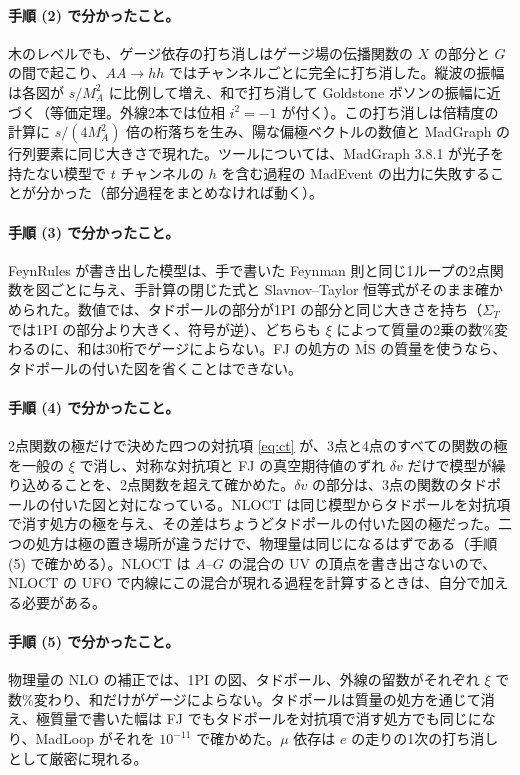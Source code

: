 \documentclass[a4paper,10pt]{ltjsarticle}
\newcommand{\MSbar}{\overline{\mathrm{MS}}}
\begin{document}
\paragraph{手順 (2) で分かったこと。}木のレベルでも、ゲージ依存の打ち消しはゲージ場の伝播関数の $X$ の部分と $G$ の間で起こり、$AA\to hh$ ではチャンネルごとに完全に打ち消した。縦波の振幅は各図が $s/M_A^2$ に比例して増え、和で打ち消して Goldstone ボソンの振幅に近づく（等価定理。外線2本では位相 $i^2=-1$ が付く）。この打ち消しは倍精度の計算に $s/(4M_A^2)$ 倍の桁落ちを生み、陽な偏極ベクトルの数値と MadGraph の行列要素に同じ大きさで現れた。ツールについては、MadGraph 3.8.1 が光子を持たない模型で $t$ チャンネルの $h$ を含む過程の MadEvent の出力に失敗することが分かった（部分過程をまとめなければ動く）。

\paragraph{手順 (3) で分かったこと。}FeynRules が書き出した模型は、手で書いた Feynman 則と同じ1ループの2点関数を図ごとに与え、手計算の閉じた式と Slavnov--Taylor 恒等式がそのまま確かめられた。数値では、タドポールの部分が1PI の部分と同じ大きさを持ち（$\Sigma_T$ では1PI の部分より大きく、符号が逆）、どちらも $\xi$ によって質量の2乗の数\%変わるのに、和は30桁でゲージによらない。FJ の処方の $\MSbar$ の質量を使うなら、タドポールの付いた図を省くことはできない。

\paragraph{手順 (4) で分かったこと。}2点関数の極だけで決めた四つの対抗項 \eqref{eq:ct} が、3点と4点のすべての関数の極を一般の $\xi$ で消し、対称な対抗項と FJ の真空期待値のずれ $\delta v$ だけで模型が繰り込めることを、2点関数を超えて確かめた。$\delta v$ の部分は、3点の関数のタドポールの付いた図と対になっている。NLOCT は同じ模型からタドポールを対抗項で消す処方の極を与え、その差はちょうどタドポールの付いた図の極だった。二つの処方は極の置き場所が違うだけで、物理量は同じになるはずである（手順 (5) で確かめる）。NLOCT は $A$--$G$ の混合の UV の頂点を書き出さないので、NLOCT の UFO で内線にこの混合が現れる過程を計算するときは、自分で加える必要がある。

\paragraph{手順 (5) で分かったこと。}物理量の NLO の補正では、1PI の図、タドポール、外線の留数がそれぞれ $\xi$ で数\%変わり、和だけがゲージによらない。タドポールは質量の処方を通じて消え、極質量で書いた幅は FJ でもタドポールを対抗項で消す処方でも同じになり、MadLoop がそれを $10^{-11}$ で確かめた。$\mu$ 依存は $e$ の走りの1次の打ち消しとして厳密に現れる。
\end{document}
